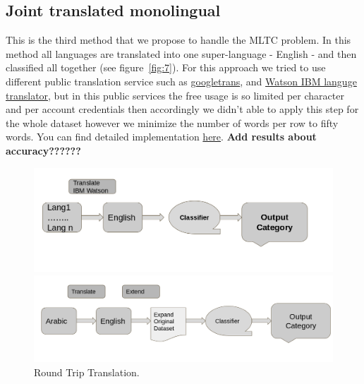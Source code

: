 \documentclass[letterpaper,12pt]{article}
\begin{document}
\subsection{Joint translated monolingual}
This is the third method that we propose to handle the MLTC problem. In this method all languages are translated into one super-language - English - and then classified all together (see figure~\ref{fig:7}). For this approach we tried to use different public translation service such as \href{https://py-googletrans.readthedocs.io/en/latest/}{googletrans}, and \href{https://www.ibm.com/watson/services/language-translator/}{Watson IBM languge translator}, but in this public services the free usage is so limited per character and per account credentials then accordingly we didn't able to apply this step for the whole dataset however we minimize the number of words per row to fifty words. You can find detailed implementation  \href{https://github.com/nesmaAlmoazamy/Handling_Multilinguality/blob/master/IBMTranslationPOC.ipynb}{here}. \textbf{Add results about accuracy??????}


\begin{figure}
	\centering
	\begin{minipage}[b]{.4\textwidth}
		\centering \includegraphics[width=0.8\columnwidth]{trans.png}
		
		\caption{
			\label{fig:7} %
			Joint translated monolingual
		}
		
	\end{minipage}\qquad
	\begin{minipage}[b]{.4\textwidth}
		
		\centering \includegraphics[width=0.8\columnwidth]{5.png}
		
		\caption{
			\label{fig:8} %
			Round Trip Translation.
		}
		
	\end{minipage}
\end{figure}
\end{document}
